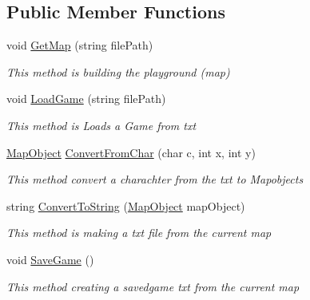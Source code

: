 \subsection*{Public Member Functions}
\begin{DoxyCompactItemize}
\item 
void \mbox{\hyperlink{class_bomberman_1_1_business_logic_1_1_game_model_acadffe349bcbe6f81eca43d7f57b2763}{Get\+Map}} (string file\+Path)
\begin{DoxyCompactList}\small\item\em This method is building the playground (map) \end{DoxyCompactList}\item 
void \mbox{\hyperlink{class_bomberman_1_1_business_logic_1_1_game_model_a77b69dcba720a486db46fadeeb56845b}{Load\+Game}} (string file\+Path)
\begin{DoxyCompactList}\small\item\em This method is Loads a Game from txt \end{DoxyCompactList}\item 
\mbox{\hyperlink{class_bomberman_1_1_model_1_1_map_object}{Map\+Object}} \mbox{\hyperlink{class_bomberman_1_1_business_logic_1_1_game_model_a11dc816885d5b87ba3a586326a3913e4}{Convert\+From\+Char}} (char c, int x, int y)
\begin{DoxyCompactList}\small\item\em This method convert a charachter from the txt to Mapobjects \end{DoxyCompactList}\item 
string \mbox{\hyperlink{class_bomberman_1_1_business_logic_1_1_game_model_a4fbace2001a33d4a334062a0cd1b4323}{Convert\+To\+String}} (\mbox{\hyperlink{class_bomberman_1_1_model_1_1_map_object}{Map\+Object}} map\+Object)
\begin{DoxyCompactList}\small\item\em This method is making a txt file from the current map \end{DoxyCompactList}\item 
void \mbox{\hyperlink{class_bomberman_1_1_business_logic_1_1_game_model_a7a4737ede67178c084860b69b5feef15}{Save\+Game}} ()
\begin{DoxyCompactList}\small\item\em This method creating a savedgame txt from the current map \end{DoxyCompactList}\end{DoxyCompactItemize}
